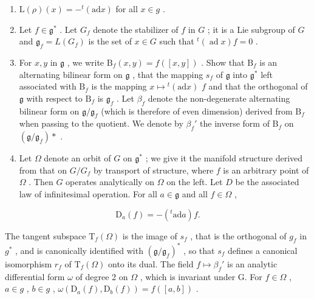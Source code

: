 \begin{enumerate}
\def\labelenumi{(\alph{enumi})}
\item
  \(\mathrm{L}(\rho)(x) = -^{t}(\mathrm{ad} x)\) for all \(x \in g\) .
\item
  Let \(f \in \mathfrak{g}^*\) . Let \(G_f\) denote the stabilizer of \(f\) in \(G\) ; it is a Lie subgroup of \(G\) and \(\mathfrak{g}_f = L(G_f)\) is the set of \(x \in G\) such that \({}^t (\operatorname{ad}x)f = 0\) .
\item
  For \(x, y\) in \(\mathfrak{g}\) , we write \(\mathrm{B}_f(x, y) = f([x, y])\) . Show that \(\mathrm{B}_f\) is an alternating bilinear form on \(\mathfrak{g}\) , that the mapping \(s_f\) of \(\mathfrak{g}\) into \(\mathfrak{g}^*\) left associated with \(\mathrm{B}_f\) is the mapping \(x \mapsto {}^t (\mathrm{ad}x)\) \(f\) and that the orthogonal of \(\mathfrak{g}\) with respect to \(\mathrm{B}_f\) is \(\mathfrak{g}_f\) . Let \(\beta_f\) denote the non-degenerate alternating bilinear form on \(\mathfrak{g} / \mathfrak{g}_f\) (which is therefore of even dimension) derived from \(\mathrm{B}_f\) when passing to the quotient. We denote by \(\beta_f'\) the inverse form of \(\mathrm{B}_f\) on \((\mathfrak{g} / \mathfrak{g}_f)*\) .
\item
  Let \(\Omega\) denote an orbit of \(G\) on \(\mathfrak{g}^*\) ; we give it the manifold structure derived from that on \(G / G_f\) by transport of structure, where \(f\) is an arbitrary point of \(\Omega\) . Then \(G\) operates analytically on \(\Omega\) on the left. Let \(D\) be the associated law of infinitesimal operation. For all \(a \in \mathfrak{g}\) and all \(f \in \Omega\) ,
\end{enumerate}

\[
\mathrm{D} _ {a} (f) = - (^ {t} \mathrm{ad} a) f.
\]

The tangent subspace \(\mathrm{T}_{f}(\Omega)\) is the image of \(s_{f}\) , that is the orthogonal of \(g_{f}\) in \(g^{*}\) , and is canonically identified with \((\mathfrak{g}/\mathfrak{g}_{f})^{*}\) , so that \(s_{f}\) defines a canonical isomorphism \(r_{f}\) of \(\mathrm{T}_{f}(\Omega)\) onto its dual. The field \(f \mapsto \beta_{f}'\) is an analytic differential form \(\omega\) of degree 2 on \(\Omega\) , which is invariant under G. For \(f \in \Omega\) , \(a \in g\) , \(b \in g\) , \(\omega(\mathrm{D}_{a}(f), \mathrm{D}_{b}(f)) = f([a, b])\) .

